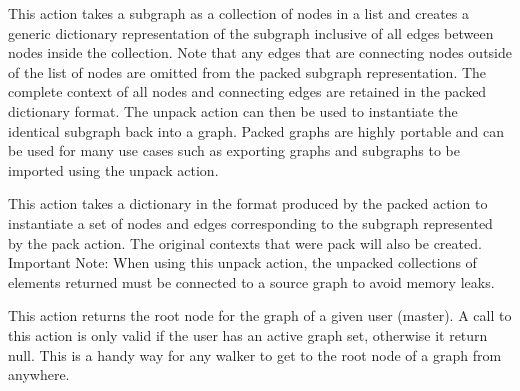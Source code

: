 {This action takes a subgraph as a collection of nodes in a list and
creates a generic dictionary representation of the subgraph inclusive of
all edges between nodes inside the collection. Note that any edges that are
connecting nodes outside of the list of nodes are omitted from the packed
subgraph representation. The complete context of all nodes and connecting edges
are retained in the packed dictionary format. The unpack action can then be used
to instantiate the identical subgraph back into a graph. Packed graphs are
highly portable and can be used for many use cases such as exporting graphs and
subgraphs to be imported using the unpack action.\vspace{4mm}\par
{}\vspace{4mm}\par
{}}
{This action takes a dictionary in the format produced by the packed action
to instantiate a set of nodes and edges corresponding to the subgraph represented
by the pack action. The original contexts that were pack will also be created.
Important Note: When using this unpack action, the unpacked collections of elements
returned must be connected to a source graph to avoid memory leaks.\vspace{4mm}\par
{}\vspace{4mm}\par
{}}
{This action returns the root node for the graph of a given user (master). A call
to this action is only valid if the user has an active graph set, otherwise it
return null. This is a handy way for any walker to get to the root node of a
graph from anywhere.\vspace{4mm}\par
{}}
